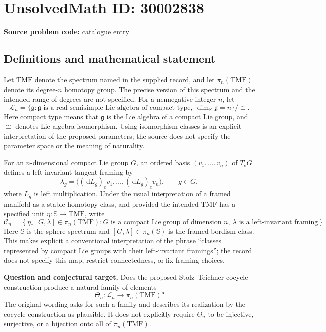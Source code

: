 \documentclass[11pt]{article}
\newcommand{\R}{\mathbb{R}}
\newcommand{\dd}{\,\mathrm{d}}
\begin{document}
\section*{UnsolvedMath ID: 30002838}
\textbf{Source problem code:} catalogue entry
\subsection{Definitions and mathematical statement}
Let \(\mathrm{TMF}\) denote the spectrum named in the supplied record, and let \(\pi_n(\mathrm{TMF})\) denote its degree-\(n\) homotopy group. The precise version of this spectrum and the intended range of degrees are not specified. For a nonnegative integer \(n\), let
\[
\mathcal L_n=\{\mathfrak g:\mathfrak g\text{ is a real semisimple Lie algebra of compact type},\ \dim_{\R}\mathfrak g=n\}/\cong.
\]
Here compact type means that \(\mathfrak g\) is the Lie algebra of a compact Lie group, and \(\cong\) denotes Lie algebra isomorphism. Using isomorphism classes is an explicit interpretation of the proposed parameters; the source does not specify the parameter space or the meaning of naturality.

For an \(n\)-dimensional compact Lie group \(G\), an ordered basis \((v_1,\ldots,v_n)\) of \(T_eG\) defines a left-invariant tangent framing by
\[
\lambda_g=\bigl((\dd L_g)_e v_1,\ldots,(\dd L_g)_e v_n\bigr),\qquad g\in G,
\]
where \(L_g\) is left multiplication. Under the usual interpretation of a framed manifold as a stable homotopy class, and provided the intended \(\mathrm{TMF}\) has a specified unit \(\eta:\mathbb S\to\mathrm{TMF}\), write
\[
\mathcal C_n=\left\{\eta_*[G,\lambda]\in\pi_n(\mathrm{TMF}):G\text{ is a compact Lie group of dimension }n,\ \lambda\text{ is a left-invariant framing}\right\}.
\]
Here \(\mathbb S\) is the sphere spectrum and \([G,\lambda]\in\pi_n(\mathbb S)\) is the framed bordism class. This makes explicit a conventional interpretation of the phrase ``classes represented by compact Lie groups with their left-invariant framings''; the record does not specify this map, restrict connectedness, or fix framing choices.

\textbf{Question and conjectural target.} Does the proposed Stolz--Teichner cocycle construction produce a natural family of elements
\[
\Theta_n:\mathcal L_n\longrightarrow\pi_n(\mathrm{TMF})?
\]
The original wording asks for such a family and describes its realization by the cocycle construction as plausible. It does not explicitly require \(\Theta_n\) to be injective, surjective, or a bijection onto all of \(\pi_n(\mathrm{TMF})\).
\end{document}

